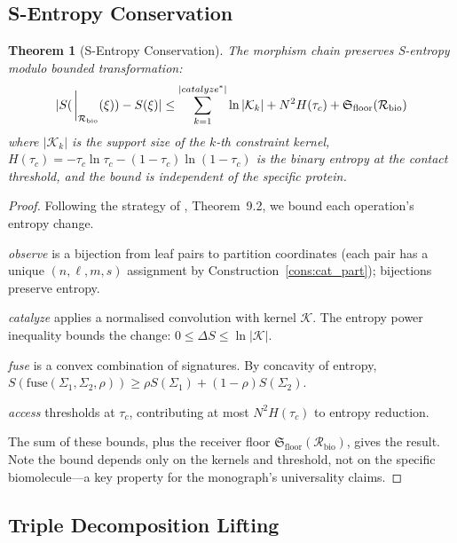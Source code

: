 \documentclass[11pt,twocolumn,a4paper]{article}
\newtheorem{theorem}{Theorem}[section]
\theoremstyle{definition}
\theoremstyle{remark}
\newcommand{\Recv}{\mathcal{R}}
\newcommand{\Floor}{{\mathfrak{S}_{\mathrm{floor}}}}
\newcommand{\Sexp}{\xi}
\newcommand{\catalyst}{\mathcal{K}}
\newcommand{\Sig}{\Sigma}
\begin{document}
\subsection{S-Entropy Conservation}

\begin{theorem}[S-Entropy Conservation]
\label{thm:s_conservation}
The morphism chain preserves S-entropy modulo bounded transformation:
\begin{equation}
|S(\eval_{\Recv_{\mathrm{bio}}}(\Sexp)) - S(\Sexp)| \leq \sum_{k=1}^{|catalyze^*|} \ln |\catalyst_k| + N^2 H(\tau_c) + \Floor(\Recv_{\mathrm{bio}})
\end{equation}
where $|\catalyst_k|$ is the support size of the $k$-th constraint kernel, $H(\tau_c) = -\tau_c \ln \tau_c - (1 - \tau_c) \ln(1 - \tau_c)$ is the binary entropy at the contact threshold, and the bound is independent of the specific protein.
\end{theorem}

\begin{proof}
Following the strategy of \citep{sachikonye2025fold}, Theorem~9.2, we bound each operation's entropy change.

\emph{observe} is a bijection from leaf pairs to partition coordinates (each pair has a unique $(n, \ell, m, s)$ assignment by Construction~\ref{cons:cat_part}); bijections preserve entropy.

\emph{catalyze} applies a normalised convolution with kernel $\catalyst$. The entropy power inequality bounds the change: $0 \leq \Delta S \leq \ln |\catalyst|$.

\emph{fuse} is a convex combination of signatures. By concavity of entropy, $S(\mathrm{fuse}(\Sig_1, \Sig_2, \rho)) \geq \rho S(\Sig_1) + (1 - \rho) S(\Sig_2)$.

\emph{access} thresholds at $\tau_c$, contributing at most $N^2 H(\tau_c)$ to entropy reduction.

The sum of these bounds, plus the receiver floor $\Floor(\Recv_{\mathrm{bio}})$, gives the result. Note the bound depends only on the kernels and threshold, not on the specific biomolecule---a key property for the monograph's universality claims.
\end{proof}

\subsection{Triple Decomposition Lifting}
\end{document}
